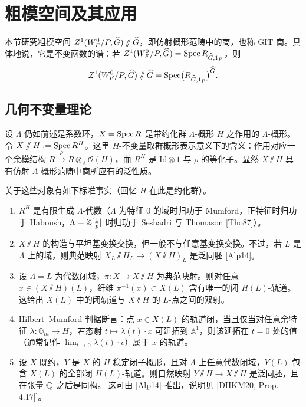 \section{粗模空间及其应用}

本节研究粗模空间 $Z^1(W_F^0/P,\widehat{G})\sslash\widehat{G}$，即仿射概形范畴中的商，也称 GIT 商。具体地说，它是不变函数的谱：若 $Z^1(W_F^0/P,\widehat{G})=\operatorname{Spec} R_{\widehat{G},1_P}$，则
\[
Z^1(W_F^0/P,\widehat{G})\sslash\widehat{G}=\operatorname{Spec}\bigl(R_{\widehat{G},1_P}\bigr)^{\widehat{G}}.
\]

\subsection{几何不变量理论}
设 $\Lambda$ 仍如前述是系数环，$X=\operatorname{Spec} R$ 是带约化群 $\Lambda$-概形 $H$ 之作用的 $\Lambda$-概形。令 $X\sslash H:=\operatorname{Spec} R^H$。这里 $H$-不变量取群概形表示意义下的含义：作用对应一个余模结构 $R\xrightarrow{\rho}R\otimes_\Lambda\mathcal O(H)$，而 $R^H$ 是 $\mathrm{Id}\otimes1$ 与 $\rho$ 的等化子。显然 $X\sslash H$ 具有仿射 $\Lambda$-概形范畴中商所应有的泛性质。

关于这些对象有如下标准事实（回忆 $H$ 在此是约化群）。

\begin{enumerate}[leftmargin=2.4em,itemsep=0.15em]
\item $R^H$ 是有限生成 $\Lambda$-代数（$\Lambda$ 为特征 $0$ 的域时归功于 Mumford，正特征时归功于 Haboush，$\Lambda=\mathbb{Z}[\frac1p]$ 时归功于 Seshadri 与 Thomason [Tho87]）。
\item $X\sslash H$ 的构造与平坦基变换交换，但一般不与任意基变换交换。不过，若 $L$ 是 $\Lambda$ 上的域，则典范映射 $X_L\sslash H_L\to(X\sslash H)_L$ 是泛同胚 [Alp14]。
\item 设 $\Lambda=L$ 为代数闭域，$\pi:X\to X\sslash H$ 为典范映射。则对任意 $x\in(X\sslash H)(L)$，纤维 $\pi^{-1}(x)\subset X(L)$ 含有唯一的闭 $H(L)$-轨道。这给出 $X(L)$ 中的闭轨道与 $X\sslash H$ 的 $L$-点之间的双射。
\item Hilbert--Mumford 判据断言：点 $x\in X(L)$ 的轨道闭，当且仅当对任意余特征 $\lambda:\mathbb G_m\to H$，若态射 $t\mapsto\lambda(t)\cdot x$ 可延拓到 $\mathbb A^1$，则该延拓在 $t=0$ 处的值（通常记作 $\lim_{t\to0}\lambda(t)\cdot v$）属于 $x$ 的轨道。
\item 设 $X$ 既约，$Y$ 是 $X$ 的 $H$-稳定闭子概形，且对 $\Lambda$ 上任意代数闭域，$Y(L)$ 包含 $X(L)$ 的全部闭 $H(L)$-轨道。则自然映射 $Y\sslash H\to X\sslash H$ 是泛同胚，且在张量 $\mathbb{Q}$ 之后是同构。[这可由 [Alp14] 推出，说明见 [DHKM20, Prop. 4.17]]。
\end{enumerate}

